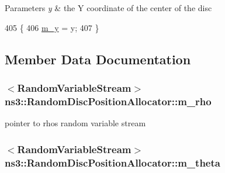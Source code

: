 \begin{DoxyParams}{Parameters}
{\em y} & the Y coordinate of the center of the disc \\
\hline
\end{DoxyParams}

\begin{DoxyCode}
405 \{
406   \hyperlink{classns3_1_1RandomDiscPositionAllocator_a2ad7aee755524f830dd1c86b9d793495}{m\_y} = y;
407 \}
\end{DoxyCode}


\subsection{Member Data Documentation}
\subsubsection[{\texorpdfstring{m\+\_\+rho}{m_rho}}]{$<${\bf Random\+Variable\+Stream}$>$ ns3\+::\+Random\+Disc\+Position\+Allocator\+::m\+\_\+rho\hspace{0.3cm}{\ttfamily [private]}}\hypertarget{classns3_1_1RandomDiscPositionAllocator_a2ece7a1600c3c7ca547e6b1f62408562}{}\label{classns3_1_1RandomDiscPositionAllocator_a2ece7a1600c3c7ca547e6b1f62408562}


pointer to rho\textquotesingle{}s random variable stream 

\subsubsection[{\texorpdfstring{m\+\_\+theta}{m_theta}}]{$<${\bf Random\+Variable\+Stream}$>$ ns3\+::\+Random\+Disc\+Position\+Allocator\+::m\+\_\+theta\hspace{0.3cm}{\ttfamily [private]}}\hypertarget{classns3_1_1RandomDiscPositionAllocator_ae31b2706470a36a86f55e80d30580a49}{}\label{classns3_1_1RandomDiscPositionAllocator_ae31b2706470a36a86f55e80d30580a49}


